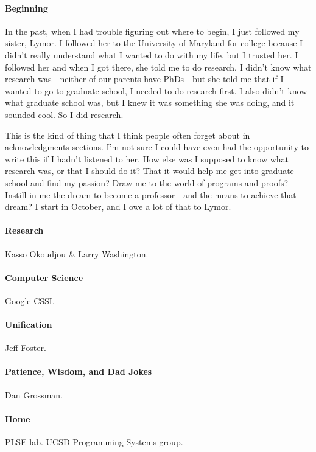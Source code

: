 \documentclass[ twoside,openright,titlepage,numbers=noenddot,headinclude,
                footinclude=true,cleardoublepage=empty,abstractoff,%
                BCOR=5mm,paper=letter,fontsize=11pt,letterpaper,%
                american,%
                ]{scrreprt}
\begin{document}
\paragraph{Beginning}
In the past, when I had trouble figuring out where to begin, I just followed my sister, Lymor.
I followed her to the University of Maryland for college because I didn't really understand what I wanted to do with my life,
but I trusted her.
I followed her and when I got there, she told me to do research.
I didn't know what research was---neither of our parents have PhDs---but she told me that if I wanted to go to graduate school,
I needed to do research first.
I also didn't know what graduate school was, but I knew it was something she was doing, and it sounded cool.
So I did research.

This is the kind of thing that I think people often forget about in acknowledgments sections.
I'm not sure I could have even had the opportunity to write this if I hadn't listened to her.
How else was I supposed to know what research was, or that I should do it?
That it would help me get into graduate school and find my passion?
Draw me to the world of programs and proofs?
Instill in me the dream to become a professor---and the means to achieve that dream?
I start in October, and I owe a lot of that to Lymor.

\paragraph{Research}
Kasso Okoudjou \& Larry Washington.

\paragraph{Computer Science}
Google CSSI.

\paragraph{Unification}
Jeff Foster.

\paragraph{Patience, Wisdom, and Dad Jokes}
Dan Grossman.

\paragraph{Home}
PLSE lab.
UCSD Programming Systems group.
\end{document}
